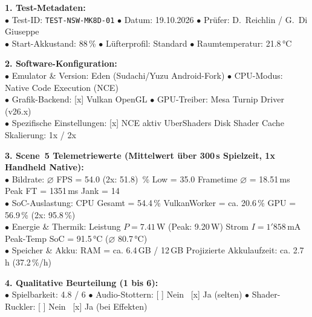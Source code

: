 \documentclass[12pt,a4paper]{scrartcl}
\begin{document}
\begin{tcolorbox}[colback=boxBg, colframe=boxBorder, arc=2mm, title={\textbf{Messprotokoll 3: Nintendo Switch -- Mario Kart 8 Deluxe}}]
    \small
    \textbf{1. Test-Metadaten:}\\
    $\bullet$ Test-ID: \texttt{TEST-NSW-MK8D-01} \quad $\bullet$ Datum: 19.10.2026 \quad $\bullet$ Prüfer: D.~Reichlin / G.~Di Giuseppe\\
    $\bullet$ Start-Akkustand: 88\,\% \quad $\bullet$ Lüfterprofil: Standard \quad $\bullet$ Raumtemperatur: 21.8\,°C

    \medskip
    \textbf{2. Software-Konfiguration:}\\
    $\bullet$ Emulator \& Version: Eden (Sudachi/Yuzu Android-Fork) \quad $\bullet$ CPU-Modus: Native Code Execution (NCE)\\
    $\bullet$ Grafik-Backend: [x] Vulkan \quad [ ] OpenGL \qquad $\bullet$ GPU-Treiber: Mesa Turnip Driver (v26.x)\\
    $\bullet$ Spezifische Einstellungen: [x] NCE aktiv \quad [ ] UberShaders \quad [x] Disk Shader Cache \quad Skalierung: 1x / 2x

    \medskip
    \textbf{3. Scene~5 Telemetriewerte (Mittelwert über 300\,s Spielzeit, 1x Handheld Native):}\\
    $\bullet$ Bildrate: $\varnothing$ FPS = 54.0 (2x: 51.8) \,\% Low = 35.0 \quad Frametime $\varnothing$ = 18.51\,ms \quad Peak FT = 1351\,ms \quad Jank = 14\\
    $\bullet$ SoC-Auslastung: CPU Gesamt = 54.4\,\% \quad VulkanWorker = ca. 20.6\,\% \quad GPU = 56.9\,\% (2x: 95.8\,\%)\\
    $\bullet$ Energie \& Thermik: Leistung $P = 7.41$\,W (Peak: 9.20\,W) \quad Strom $I = 1'858$\,mA \quad Peak-Temp SoC = 91.5\,°C ($\varnothing$ 80.7\,°C)\\
    $\bullet$ Speicher \& Akku: RAM = ca. 6.4\,GB / 12\,GB \quad Projizierte Akkulaufzeit: ca. 2.7\,h (37.2\,\%/h)

    \medskip
    \textbf{4. Qualitative Beurteilung (1 bis 6):}\\
    $\bullet$ Spielbarkeit: 4.8 / 6 \quad $\bullet$ Audio-Stottern: [ ] Nein \ [x] Ja (selten) \quad $\bullet$ Shader-Ruckler: [ ] Nein \ [x] Ja (bei Effekten)
\end{tcolorbox}
\end{document}
